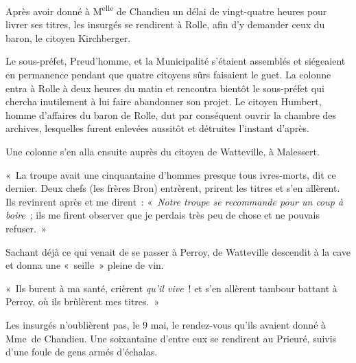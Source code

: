 \documentclass[french,twoside]{book} %
\newenvironment{quoteblock}%
  {\begin{quoting}}
  {\end{quoting}}
\newenvironment{quotebar}{%
    \def\FrameCommand{{\color{rubric!10!}\vrule width 0.5em} \hspace{0.9em}}%
    \def\OuterFrameSep{\itemsep} %
    \MakeFramed {\advance\hsize-\width \FrameRestore}
  }%
  {%
    \endMakeFramed
  }
\renewenvironment{quoteblock}%
  {%
    \savenotes
    \setstretch{0.9}
    \normalfont
    \begin{quotebar}
  }
  {%
    \end{quotebar}
    \spewnotes
  }
\begin{document}
\noindent Après avoir donné à M\textsuperscript{elle} de Chandieu un délai de vingt-quatre heures pour livrer ses titres, les insurgés se rendirent à Rolle, afin d’y demander ceux du baron, le citoyen Kirchberger.\par
Le sous-préfet, Preud’homme, et la Municipalité s’étaient assemblés et siégeaient en permanence pendant que quatre citoyens sûrs faisaient le guet. La colonne entra à Rolle à deux heures du matin et rencontra bientôt le sous-préfet qui chercha inutilement à lui faire abandonner son projet. Le citoyen Humbert, homme d’affaires du baron de Rolle, dut par conséquent ouvrir la chambre des archives, lesquelles furent enlevées aussitôt et détruites l’instant d’après.\par
Une colonne s’en alla ensuite auprès du citoyen de Watteville, à Malessert.\par

\begin{quoteblock}
\noindent « La troupe avait une cinquantaine d’hommes presque tous ivres-morts, dit ce dernier. Deux chefs (les frères Bron) entrèrent, prirent les titres et s’en allèrent. Ils revinrent après et me dirent : « \emph{Notre troupe se recommande pour un coup à boire} ; ils me firent observer que je perdais très peu de chose et ne pouvais refuser. »\end{quoteblock}

\noindent Sachant déjà ce qui venait de se passer à Perroy, de Watteville descendit à la cave et donna une « seille » pleine de vin.\par

\begin{quoteblock}
\noindent « Ils burent à ma santé, crièrent \emph{qu’il vive} ! et s’en allèrent tambour battant à Perroy, où ils brûlèrent mes titres. »\end{quoteblock}

\noindent Les insurgés n’oublièrent pas, le 9 mai, le rendez-vous qu’ils avaient donné à Mme de Chandieu. Une soixantaine d’entre eux se rendirent au Prieuré, suivis d’une foule de gens armés d’échalas.\par
\end{document}

